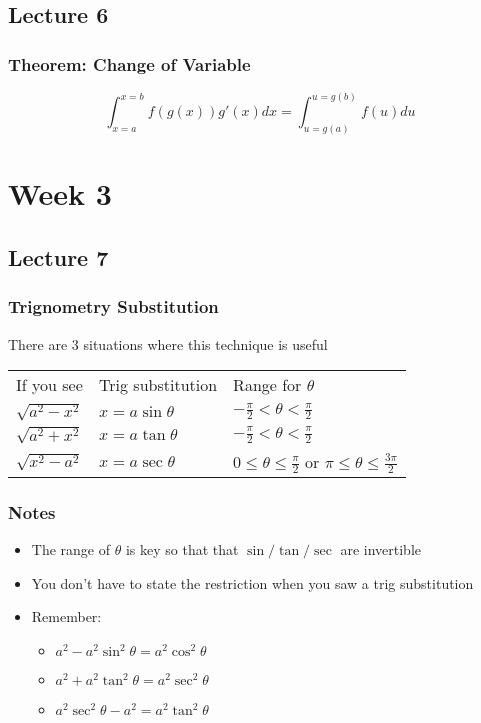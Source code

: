 \documentclass[12pt, letterpaper]{article}
\begin{document}
\subsection{Lecture 6}
\subsubsection{Theorem: Change of Variable}
\[\displaystyle\int_{x=a}^{x=b}f(g(x))g'(x)dx = \int_{u=g(a)}^{u=g(b)}f(u)du\]

\section{Week 3}
\subsection{Lecture 7}
\subsubsection{Trignometry Substitution}
There are 3 situations where this technique is useful
\begin{center}
\begin{tabular}{l|l|l}
    If you see                               & Trig substitution                                & Range for $\theta$ \\ 
    $\sqrt{a^2 - x^2}$                       & $x = a\sin\theta$                                & $-\frac{\pi}{2} < \theta < \frac{\pi}{2}$ \\
    $\sqrt{a^2 + x^2}$                       & $x = a\tan\theta$                                & $-\frac{\pi}{2} < \theta < \frac{\pi}{2}$ \\
    $\sqrt{x^2 - a^2}$                       & $x = a\sec\theta$                                & $0 \leq \theta \leq \frac{\pi}{2}$ or $\pi \leq \theta \leq \frac{3\pi}{2}$
\end{tabular}
\end{center}
\subsubsection*{Notes}
\begin{itemize}
    \item The range of $\theta$ is key so that that $\sin / \tan / \sec$ are invertible
    \item You don't have to state the restriction when you saw a trig substitution
    \item Remember: \begin{itemize}
        \item[] $a^2 - a^2\sin^2\theta = a^2\cos^2\theta$
        \item[] $a^2 + a^2\tan^2\theta = a^2\sec^2\theta$
        \item[] $a^2\sec^2\theta - a^2 = a^2\tan^2\theta$
    \end{itemize}
\end{itemize}
\end{document}
